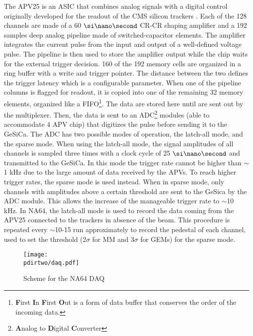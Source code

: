 The APV25 is an ASIC that combines analog signals with a digital control \cite{Bodlak_2013} originally developed for the readout of the CMS silicon trackers \cite{article,inproceedings,apv-useguide}. Each of the 128 channels are made of a 60 $\nas$ CR-CR shaping amplifier and a 192 samples deep analog pipeline made of switched-capacitor elements. The amplifier integrates the current pulse from the input and output of a well-defined voltage pulse. The pipeline is then used to store the amplifier output while the chip waits for the external trigger decision. 160 of the 192 memory cells are organized in a ring buffer with a write and trigger pointer. The distance between the two defines the trigger latency which is a configurable parameter. When one of the pipeline columns is flagged for readout, it is copied into one of the remaining 32 memory elements, organized like a FIFO\footnote{\textbf{F}irst \textbf{I}n \textbf{F}irst \textbf{O}ut is a form of data buffer that conserves the order of the incoming data.}. The data are stored here until are sent out by the multiplexer. Then, the data is sent to an ADC\footnote{\textbf{A}nalog to \textbf{D}igital \textbf{C}onverter} modules (able to accommodate 4 APV chip) that digitizes the pulse before sending it to the GeSiCa. The ADC has two possible modes of operation, the latch-all mode, and the sparse mode. When using the latch-all mode, the signal amplitudes of all channels is sampled three times with a clock cycle of 25 $\nas$ and transmitted to the GeSiCa. In this mode the trigger rate cannot be higher than $\sim$1 \si{\kilo\hertz} due to the large amount of data received by the APVs. To reach higher trigger rates, the sparse mode is used instead. When in sparse mode, only channels with amplitudes above a certain threshold are sent to the GeSica by the ADC module. This allows the increase of the manageable trigger rate to $\sim$10 \si{\kilo\hertz}. In NA64, the latch-all mode is used to record the data coming from the APV25 connected to the trackers in absence of the beam. This procedure is repeated every $\sim$10-15 run approximately to record the pedestal of each channel, used to set the threshold (2$\sigma$ for MM and 3$\sigma$ for GEMs) for the sparse mode.

\begin{figure}[tbh!]
\centering
\texttt{[image: \\pdirtwo/daq.pdf]}
\caption{Scheme for the NA64 DAQ}
\label{fig:daq}
\end{figure}

